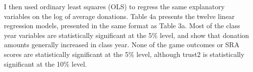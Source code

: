 \documentclass[12pt]{article}
\begin{document}
I then used ordinary least squares (OLS) to regress the same explanatory variables on the log of average donations. Table 4a presents the twelve linear regression models, presented in the same format as Table 3a. Most of the class year variables are statistically significant at the 5\% level, and show that donation amounts generally increased in class year. None of the game outcomes or SRA scores are statistically significant at the 5\% level, although trust2 is statistically significant at the 10\% level.

\end{document}
